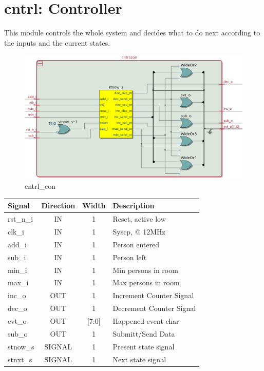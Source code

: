 \documentclass[12pt,a4 paper] {report}
\begin{document}
\newpage

\section{cntrl: Controller}
This module controls the whole system and decides what to do next according to the inputs and the current states.
\begin{figure}[h]
	\centering	
	\includegraphics[scale=0.25]{../png/cntrl_con.png}
	\caption{cntrl\_con}
\end{figure}
\begin{center}
	\begin{tabular}{ | p{2cm} | c | c | p{5cm} |}
		\hline
		\textbf{Signal} & \textbf{Direction} & \textbf{Width} & \textbf{Description} \\
		\hline	
		rst\_n\_i & IN & 1 & Reset, active low \\
		\hline
		clk\_i & IN & 1 & Syscp, @ 12MHz \\
		\hline
		add\_i & IN & 1 & Person entered \\
		\hline
		sub\_i & IN & 1 & Person left \\
		\hline
		min\_i & IN & 1 & Min persons in room \\
		\hline
		max\_i & IN & 1 & Max persons in room \\
		\hline
		inc\_o & OUT & 1 & Increment Counter Signal \\
		\hline
		dec\_o & OUT & 1 & Decrement Counter Signal \\
		\hline
		evt\_o & OUT & [7:0] & Happened event char \\
		\hline
		sub\_o & OUT & 1 & Submitt/Send Data \\
		\hline
		\hline
		stnow\_s & SIGNAL & 1 & Present state signal \\
		\hline
		stnxt\_s  & SIGNAL & 1 & Next state signal \\
		\hline	
	\end{tabular}
\end{center}
\end{document}
